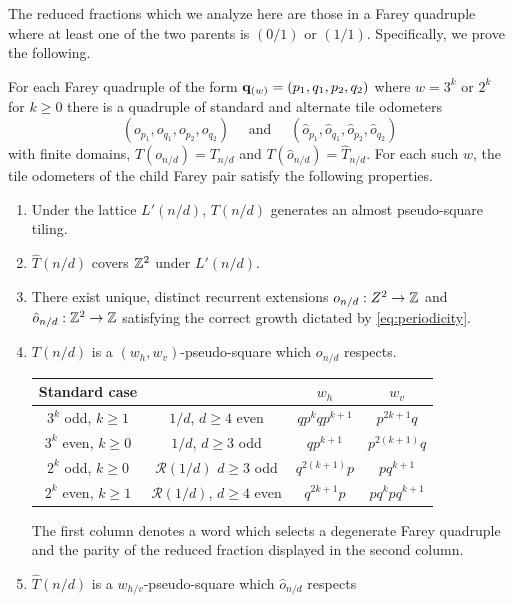 \documentclass[12pt]{amsart}
\begin{document}
The reduced fractions which we analyze here are those in a Farey quadruple where at least one of the two parents is $(0/1)$ or $(1/1)$. 
Specifically, we prove the following. 


\begin{prop} \label{prop:base_cases}
For each Farey quadruple of the form $\mathbf{q}_{(w)} = (p_1, q_1, p_2, q_2)$ where $w = 3^k$ or $2^k$ for $k \geq 0$
there is a quadruple of standard and alternate tile odometers
\[
(o_{p_1}, o_{q_1}, o_{p_2}, o_{q_2}) \quad \mbox{ and } \quad (\hat{o}_{p_1}, \hat{o}_{q_1}, \hat{o}_{p_2}, \hat{o}_{q_2}) 
\]
with finite domains, $T(o_{n/d}) = T_{n/d}$ and $T(\hat{o}_{n/d}) = \hat{T}_{n/d}$. 
For each such $w$, the tile odometers of the child Farey pair satisfy the following properties. 
\begin{enumerate}[label=(\alph*)]
	\item Under the lattice $L'(n/d)$, $T(n/d)$ generates an almost pseudo-square tiling.
	\item $\hat{T}(n/d)$ covers $\mathbb{Z}^2$ under $L'(n/d)$.
	\item There exist unique, distinct recurrent extensions $o_{n/d}:Z^2 \to \mathbb{Z}$ and $\hat{o}_{n/d}:\mathbb{Z}^2 \to \mathbb{Z}$ satisfying 
	the correct growth dictated by \eqref{eq:periodicity}.
	\item $T(n/d)$ is a $(w_h,w_v)$-pseudo-square which $o_{n/d}$ respects.
	\begin{center}
		\begin{tabular}{ c  c|c c }
			Standard case &  &$w_h$ &  $w_v$ \\ 
			\hline
			$3^k$ odd, $k \geq 1$  & $1/d$, $d \geq 4$ even & $qp^kqp^{k+1}$ & $p^{2k+1}q$  \\ 
			$3^k$ even, $k \geq 0$ & $1/d$, $d \geq 3$ odd & $qp^{k+1}$ & $p^{2(k+1)}q$ \\ 
			$2^k$ odd,  $k \geq 0$& $\mathcal{R}(1/d)$ $d \geq 3$ odd & $q^{2(k+1)}p$ & $pq^{k+1}$ \\ 
			$2^k$ even, $k \geq 1$ &  $\mathcal{R}(1/d)$, $d \geq 4$ even  & $q^{2k+1}p$ & $pq^kpq^{k+1}$
		\end{tabular}
	\end{center}
	The first column denotes a word which selects a degenerate Farey quadruple and the parity of the reduced fraction displayed in the second column.
	\item $\hat{T}(n/d)$ is a $w_{h/v}$-pseudo-square which $\hat{o}_{n/d}$ respects
	\begin{center}
		\begin{tabular}{ c  c|c c }

\end{tabular}
\end{center}
\end{enumerate}
\end{prop}
\end{document}

